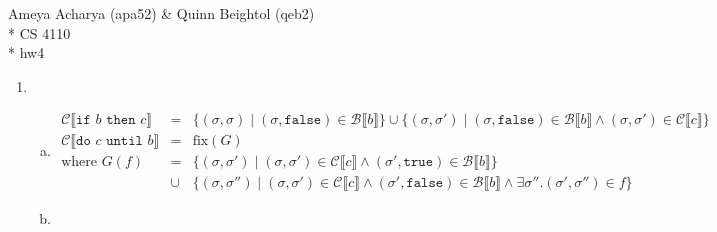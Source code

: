 \documentclass[10pt, oneside]{article}
\begin{document}
\noindent Ameya Acharya (apa52) \& Quinn Beightol (qeb2) \\*
\noindent CS 4110 \\*
\noindent hw4

\begin{enumerate}[1.]
  \item
  \begin{enumerate}[(a)] 
    \item 
    \begin{eqnarray*}
      \mathcal{C}\llbracket \texttt{if } b \texttt{ then } c \rrbracket & = & 
        \{ (\sigma, \sigma) \mid (\sigma, \texttt{false}) \in \mathcal{B}
                                                          \llbracket b \rrbracket \}
        \cup \{ (\sigma, \sigma') \mid (\sigma, \texttt{false}) \in \mathcal{B}
          \llbracket b \rrbracket \wedge (\sigma, \sigma') \in \mathcal{C}
                                                        \llbracket c \rrbracket \}\\
      \mathcal{C} \llbracket \texttt{do } c \texttt{ until } b  \rrbracket 
        & = & \text{fix}(G)\\
      \text{where } G(f) & = &
  				\{ (\sigma, \sigma') \mid (\sigma, \sigma') \in \mathcal{C} 
				                                              \llbracket c \rrbracket
		 \wedge (\sigma', \texttt{true}) \in \mathcal{B} \llbracket b \rrbracket \} \\
				& \cup & \{ (\sigma, \sigma'') \mid 
				            (\sigma, \sigma')  \in \mathcal{C} \llbracket c \rrbracket 
				     \wedge (\sigma', \texttt{false})\in \mathcal{B} \llbracket b \rrbracket
				     \wedge \exists \sigma''. (\sigma', \sigma'') \in f \}
    \end{eqnarray*}
    \item 
  \end{enumerate}


\end{enumerate}
\end{document}
